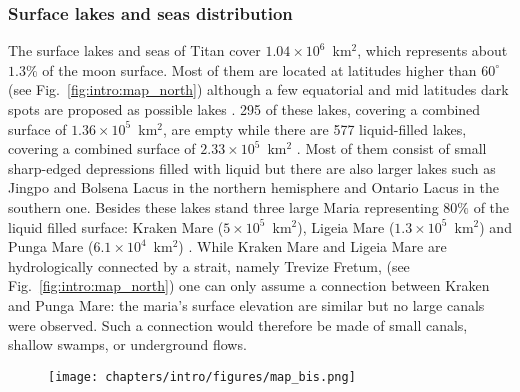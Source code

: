 \subsubsection{Surface lakes and seas distribution}
The surface lakes and seas of Titan cover $1.04\times 10^6$~km$^2$, which represents about $1.3\%$ of the moon surface. Most of them are located at latitudes higher than $60^\circ$ \citep{aharonson2009asymmetric} (see Fig.~\ref{fig:intro:map_north}) although a few equatorial and mid latitudes dark spots are proposed as possible lakes \citep{griffith2012possible}. 295 of these lakes, covering a combined surface of $1.36\times 10^5$~km$^2$, are empty while there are 577 liquid-filled lakes, covering a combined surface of $2.33\times 10^5$~km$^2$ \citep{hayes2016lakes}. Most of them consist of small sharp-edged depressions filled with liquid but there are also larger lakes such as Jingpo and Bolsena Lacus in the northern hemisphere and Ontario Lacus in the southern one. Besides these lakes stand three large Maria representing $80\%$ of the liquid filled surface: Kraken Mare ($5\times 10^5$~km$^2$), Ligeia Mare ($1.3\times 10^5$~km$^2$) and Punga Mare ($6.1\times 10^4$~km$^2$) \citep{hayes2016lakes}. While Kraken Mare and Ligeia Mare are hydrologically connected by a strait, namely Trevize Fretum, \citep{sotin2012observations} (see Fig.~\ref{fig:intro:map_north}) one can only assume a connection between Kraken and Punga Mare: the maria's surface elevation are similar \citep{hayes2017topographic,hayes2016lakes} but no large canals were observed. Such a connection would therefore be made of small canals, shallow swamps, or underground flows. 
\begin{figure}
\begin{center}
\texttt{[image: chapters/intro/figures/map\_bis.png]}
\end{center}
\vspace{-0.9cm}
\end{figure}
